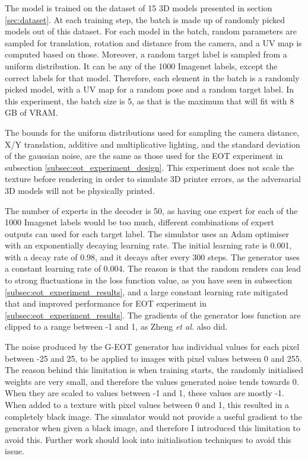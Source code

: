 The model is trained on the dataset of 15 3D models presented in section \ref{sec:dataset}. At each training step, the batch is made up of randomly picked models out of this dataset. For each model in the batch, random parameters are sampled for translation, rotation and distance from the camera, and a UV map is computed based on those. Moreover, a random target label is sampled from a uniform distribution. It can be any of the 1000 Imagenet labels, except the correct labels for that model. Therefore, each element in the batch is a randomly picked model, with a UV map for a random pose and a random target label. In this experiment, the batch size is 5, as that is the maximum that will fit with 8 GB of VRAM.

The bounds for the uniform distributions used for sampling the camera distance, X/Y translation, additive and multiplicative lighting, and the standard deviation of the gaussian noise, are the same as those used for the EOT experiment in subsection \ref{subsec:eot_experiment_design}. This experiment does not scale the texture before rendering in order to simulate 3D printer errors, as the adversarial 3D models will not be physically printed.

The number of experts in the decoder is 50, as having one expert for each of the 1000 Imagenet labels would be too much, different combinations of expert outputs can used for each target label. The simulator uses an Adam optimiser with an exponentially decaying learning rate. The initial learning rate is 0.001, with a decay rate of 0.98, and it decays after every 300 steps. The generator uses a constant learning rate of 0.004. The reason is that the random renders can lead to strong fluctuations in the loss function value, as you have seen in subsection \ref{subsec:eot_experiment_results}, and a large constant learning rate mitigated that and improved performance for EOT experiment in \ref{subsec:eot_experiment_results}. The gradients of the generator loss function are clipped to a range between -1 and 1, as Zheng \textit{et al.} \cite{zheng_black_box_GAN} also did.

The noise produced by the G-EOT generator has individual values for each pixel between -25 and 25, to be applied to images with pixel values between 0 and 255. The reason behind this limitation is when training starts, the randomly initialised weights are very small, and therefore the values generated noise tends towards 0. When they are scaled to values between -1 and 1, these values are mostly -1. When added to a texture with pixel values between 0 and 1, this resulted in a completely black image. The simulator would not provide a useful gradient to the generator when given a black image, and therefore I introduced this limitation to avoid this. Further work should look into initialisation techniques to avoid this issue.

